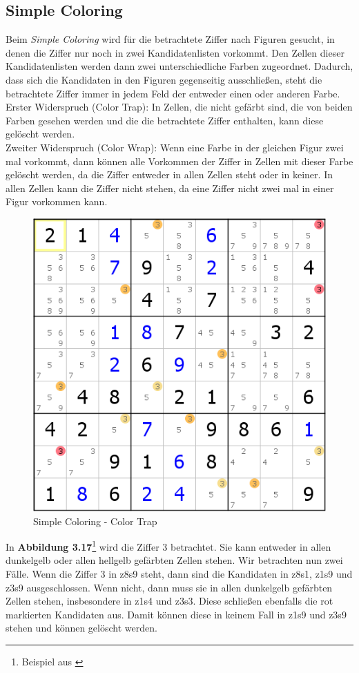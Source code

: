 \newpage
\subsection{Simple Coloring}
\label{Coloring}
Beim \textit{Simple Coloring} wird für die betrachtete Ziffer nach Figuren gesucht, in denen die Ziffer nur noch in zwei Kandidatenlisten vorkommt. Den Zellen dieser Kandidatenlisten werden dann zwei unterschiedliche Farben zugeordnet. Dadurch, dass sich die Kandidaten in den Figuren gegenseitig ausschließen, steht die betrachtete Ziffer immer in jedem Feld der entweder einen oder anderen Farbe.\\ 
Erster Widerspruch (Color Trap): In Zellen, die nicht gefärbt sind, die von beiden Farben gesehen werden und die die betrachtete Ziffer enthalten, kann diese gelöscht werden.\\
Zweiter Widerspruch (Color Wrap): Wenn eine Farbe in der gleichen Figur zwei mal vorkommt, dann können alle Vorkommen der Ziffer in Zellen mit dieser Farbe gelöscht werden, da die Ziffer entweder in allen Zellen steht oder in keiner. In allen Zellen kann die Ziffer nicht stehen, da eine Ziffer nicht zwei mal in einer Figur vorkommen kann.

\begin{figure}[h]
\begin{center}
\includegraphics{./img/simple_coloring.png}
\caption{Simple Coloring - Color Trap}
\end{center}
\end{figure}

\noindent In \textbf{Abbildung 3.17}\footnote{Beispiel aus \cite{HDKColoring}} wird die Ziffer 3 betrachtet. Sie kann entweder in allen dunkelgelb oder allen hellgelb gefärbten Zellen stehen. Wir betrachten nun zwei Fälle. Wenn die Ziffer 3 in z8s9 steht, dann sind die Kandidaten in z8s1, z1s9 und z3s9 ausgeschlossen. Wenn nicht, dann muss sie in allen dunkelgelb gefärbten Zellen stehen, insbesondere in z1s4 und z3s3. Diese schließen ebenfalls die rot markierten Kandidaten aus. Damit können diese in keinem Fall in z1s9 und z3s9 stehen und können gelöscht werden.